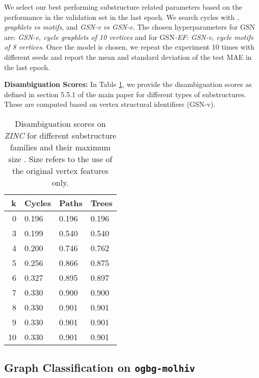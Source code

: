 We select our best performing substructure related parameters based on the performance in the validation set in the last epoch. We search cycles with  , \textit{graphlets vs motifs}, and \textit{GSN-v vs GSN-e}. The chosen hyperparameters for GSN are:  \textit{GSN-e, cycle graphlets of 10 vertices} and for GSN\textit{-EF}: \textit{GSN-v, cycle motifs of 8 vertices}. Once the model is chosen, we repeat the experiment 10 times with different seeds and report the mean and standard deviation of the test MAE in the last epoch. 

        





\noindent\textbf{Disambiguation Scores:} In Table \ref{tab:uniqueness}, we provide the disambiguation scores  as defined in section 5.5.1 of the main paper for different types of substructures. These are computed based on vertex structural identifiers (GSN-v).

\begin{table}[h]
         \centering
            \caption{Disambiguation scores  on \textit{ZINC} for different substructure families and their maximum size . Size  refers to the use of the original vertex features only.}
          \begin{tabular}{r | l | l | l}
            k & Cycles & Paths & Trees \\
            \hline
            0 & 0.196 & 0.196 & 0.196\\
            3 & 0.199 & 0.540 & 0.540\\
            4 & 0.200 & 0.746 & 0.762\\
            5 & 0.256 & 0.866 & 0.875\\
            6 & 0.327 & 0.895 & 0.897\\
            7 & 0.330 & 0.900 & 0.900\\
            8 & 0.330 & 0.901 & 0.901\\
            9 & 0.330 & 0.901 & 0.901\\
            10 & 0.330 & 0.901 & 0.901\\
          \end{tabular}\label{tab:uniqueness}
\end{table}




\subsection{Graph Classification on \texttt{ogbg-molhiv}}\label{app: molhiv}

